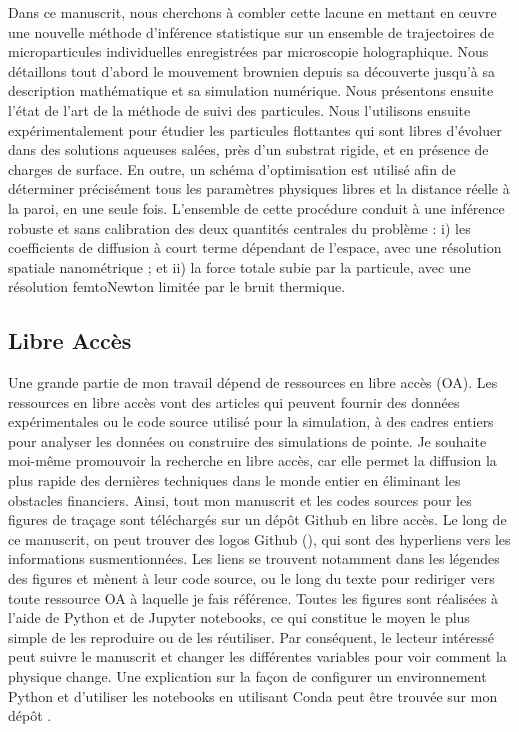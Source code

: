 Dans ce manuscrit, nous cherchons à combler cette lacune en mettant en œuvre une nouvelle méthode d'inférence statistique sur un ensemble de trajectoires de microparticules individuelles enregistrées par microscopie holographique. Nous détaillons tout d'abord le mouvement brownien depuis sa découverte jusqu'à sa description mathématique et sa simulation numérique. Nous présentons ensuite l'état de l'art de la méthode de suivi des particules. Nous l'utilisons ensuite expérimentalement pour étudier les particules flottantes qui sont libres d'évoluer dans des solutions aqueuses salées, près d'un substrat rigide, et en présence de charges de surface. En outre, un schéma d'optimisation est utilisé afin de déterminer précisément tous les paramètres physiques libres et la distance réelle à la paroi, en une seule fois. L'ensemble de cette procédure conduit à une inférence robuste et sans calibration des deux quantités centrales du problème : i) les coefficients de diffusion à court terme dépendant de l'espace, avec une résolution spatiale nanométrique ; et ii) la force totale subie par la particule, avec une résolution femtoNewton limitée par le bruit thermique. 



\subsection{Libre Accès}

Une grande partie de mon travail dépend de ressources en libre accès (OA). Les ressources en libre accès vont des articles qui peuvent fournir des données expérimentales ou le code source utilisé pour la simulation, à des cadres entiers pour analyser les données ou construire des simulations de pointe. Je souhaite moi-même promouvoir la recherche en libre accès, car elle permet la diffusion la plus rapide des dernières techniques dans le monde entier en éliminant les obstacles financiers. Ainsi, tout mon manuscrit et les codes sources pour les figures de traçage sont téléchargés sur un dépôt Github en libre accès. Le long de ce manuscrit, on peut trouver des logos Github (\href{https://github.com/eXpensia/Ma-these/}{\faGithub}), qui sont des hyperliens vers les informations susmentionnées. Les liens se trouvent notamment dans les légendes des figures et mènent à leur code source, ou le long du texte pour rediriger vers toute ressource OA à laquelle je fais référence. Toutes les figures sont réalisées à l'aide de Python et de Jupyter notebooks, ce qui constitue le moyen le plus simple de les reproduire ou de les réutiliser. Par conséquent, le lecteur intéressé peut suivre le manuscrit et changer les différentes variables pour voir comment la physique change.  Une explication sur la façon de configurer un environnement Python et d'utiliser les notebooks en utilisant Conda peut être trouvée sur mon dépôt \href{https://github.com/eXpensia/Ma-these/}{\faGithub}.




